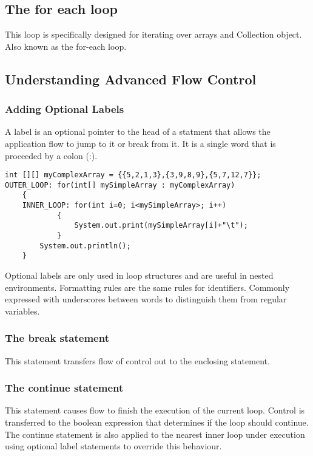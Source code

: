 \documentclass[a4paper]{report}   %
\begin{document}
\subsection{The for each loop}
This loop is specifically designed for iterating over arrays and Collection object. Also known as the for-each loop.

\subsection{Understanding Advanced Flow Control}

\subsubsection{Adding Optional Labels}

A label is an optional pointer to the head of a statment that allows the application flow to jump to it or break from it. It is a single word that is proceeded by a colon (:).

\begin{lstlisting}
int [][] myComplexArray = {{5,2,1,3},{3,9,8,9},{5,7,12,7}};
OUTER_LOOP: for(int[] mySimpleArray : myComplexArray) 
	{
	INNER_LOOP: for(int i=0; i<mySimpleArray>; i++)
			{
				System.out.print(mySimpleArray[i]+"\t");
			}
		System.out.println();
	}
\end{lstlisting}

Optional labels are only used in loop structures and are useful in nested environments. Formatting rules are the same rules for identifiers. Commonly expressed with underscores between words to distinguish them from regular variables.

\subsubsection{The break statement}

This statement transfers flow of control out to the enclosing statement.

\subsubsection{The continue statement}

This statement causes flow to finish the execution of the current loop. Control is transferred to the boolean expression that determines if the loop should continue. The continue statement is also applied to the nearest inner loop under execution using optional label statements to override this behaviour.
\end{document}
